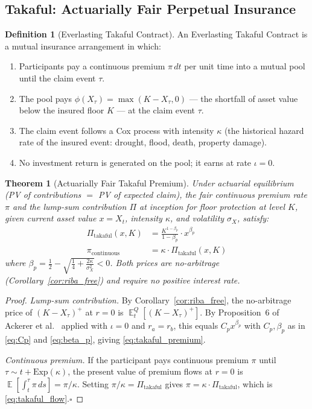 \documentclass[10pt,twocolumn]{article}
\theoremstyle{plain}
\newtheorem{theorem}{Theorem}
\theoremstyle{definition}
\newtheorem{definition}{Definition}
\DeclareMathOperator{\E}{\mathbb{E}}
\begin{document}
\subsection{Takaful: Actuarially Fair Perpetual Insurance}
\label{sec:takaful}

\begin{definition}[Everlasting Takaful Contract]
An Everlasting Takaful Contract is a mutual insurance arrangement
in which:
\begin{enumerate}[leftmargin=*,noitemsep]
\item Participants pay a continuous premium $\pi\,dt$ per unit
time into a mutual pool until the claim event $\tau$.
\item The pool pays $\phi(X_\tau) = \max(K - X_\tau, 0)$
--- the shortfall of asset value below the insured floor $K$
--- at the claim event $\tau$.
\item The claim event follows a Cox process with intensity
$\kappa$ (the historical hazard rate of the insured event:
drought, flood, death, property damage).
\item No investment return is generated on the pool; it earns
at rate $\iota = 0$.
\end{enumerate}
\end{definition}

\begin{theorem}[Actuarially Fair Takaful Premium]
\label{thm:takaful}
Under actuarial equilibrium (PV of contributions $=$ PV of
expected claim), the fair continuous premium rate $\pi$ and the
lump-sum contribution $\Pi$ at inception for floor protection
at level $K$, given current asset value $x = X_t$, intensity
$\kappa$, and volatility $\sigma_X$, satisfy:
\begin{align}
\Pi_\mathrm{takaful}(x, K)
&= \frac{K^{1-\beta_p}}{1-\beta_p}\cdot x^{\beta_p}
\label{eq:takaful_premium}\\[4pt]
\pi_\mathrm{continuous}
&= \kappa \cdot \Pi_\mathrm{takaful}(x,K)
\label{eq:takaful_flow}
\end{align}
where $\beta_p = \frac{1}{2} - \sqrt{\frac{1}{4}
+ \frac{2\kappa}{\sigma_X^2}} < 0$.
Both prices are no-arbitrage (Corollary~\textup{\ref{cor:riba_free}})
and require no positive interest rate.
\end{theorem}

\begin{proof}
\textit{Lump-sum contribution.}
By Corollary~\ref{cor:riba_free}, the no-arbitrage price of
$(K-X_\tau)^+$ at $r=0$ is $\E^Q_t[(K-X_\tau)^+]$.
By Proposition~6 of Ackerer et al.\ \cite{Ackerer2024} applied
with $\iota = 0$ and $r_a = r_b$, this equals
$C_p x^{\beta_p}$ with $C_p, \beta_p$ as in
\eqref{eq:Cp} and \eqref{eq:beta_p}, giving \eqref{eq:takaful_premium}.

\textit{Continuous premium.}
If the participant pays continuous premium $\pi$ until $\tau\sim
t+\mathrm{Exp}(\kappa)$, the present value of premium flows at
$r=0$ is $\E[\int_t^\tau \pi\,ds] = \pi/\kappa$.
Setting $\pi/\kappa = \Pi_\mathrm{takaful}$ gives
$\pi = \kappa\cdot\Pi_\mathrm{takaful}$, which is
\eqref{eq:takaful_flow}.\qquad$\square$
\end{proof}
\end{document}
